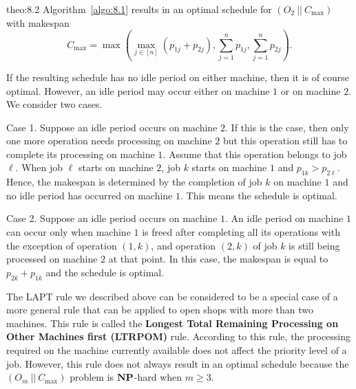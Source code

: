 \begin{theo}{theo:8.2}
    Algorithm~\ref{algo:8.1} results in an optimal schedule for 
    $(O_2~||~C_{\max})$ with makespan 
    \[ C_{\max} = \max\left( \max_{j\in[n]} (p_{1j} + p_{2j}), 
    \sum_{j=1}^n p_{1j}, \sum_{j=1}^n p_{2j} \right). \] 
\end{theo}
\begin{pf}
    If the resulting schedule has no idle period on either machine, then 
    it is of course optimal. However, an idle period may occur either on 
    machine $1$ or on machine $2$. We consider two cases. 

    {\sc Case 1.} Suppose an idle period occurs on machine $2$. 
    If this is the case, then only one more operation needs processing on 
    machine $2$ but this operation still has to complete its processing 
    on machine $1$. Assume that this operation belongs to job $\ell$. 
    When job $\ell$ starts on machine $2$, job $k$ starts on machine $1$
    and $p_{1k} > p_{2\ell}$. Hence, the makespan is determined by the 
    completion of job $k$ on machine $1$ and no idle period has occurred 
    on machine $1$. This means the schedule is optimal. 

    {\sc Case 2.} Suppose an idle period occurs on machine $1$. An idle period 
    on machine $1$ can occur only when machine $1$ is freed after completing 
    all its operations with the exception of operation $(1, k)$, and operation 
    $(2, k)$ of job $k$ is still being processed on machine $2$ at that point. 
    In this case, the makespan is equal to $p_{2k} + p_{1k}$ and the schedule 
    is optimal.
\end{pf}

The LAPT rule we described above can be considered to be a special case 
of a more general rule that can be applied to open shops with more than 
two machines. This rule is called the {\bf Longest Total Remaining 
Processing on Other Machines first (LTRPOM)} rule. According to this rule, 
the processing required on the machine currently available does not 
affect the priority level of a job. However, this rule does not always 
result in an optimal schedule because the $(O_m~||~C_{\max})$ problem is 
$\operatorname{\textbf{NP}}$-hard when $m \geq 3$. 

